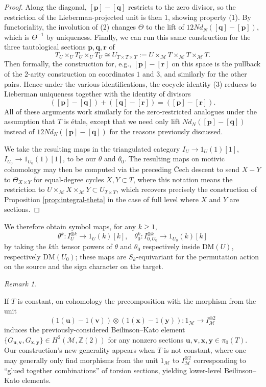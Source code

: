 \documentclass[a4paper,reqno,11pt]{amsart}
\theoremstyle{plain}
\theoremstyle{definition}
\theoremstyle{remark}
\newtheorem{remarkwr}[theorem]{Remark}
\newenvironment{remark}{\begin{remarkwr}\begin{upshape}}{\end{upshape}\end{remarkwr}}
\newcommand{\Z}{\mathbb{Z}}
\newcommand{\DM}{\mathrm{DM}}
\begin{document}
\begin{proof}
Along the diagonal, $[\mathbf p]-[\mathbf q]$ restricts to the zero divisor, so the restriction of the Lieberman-projected unit is then $1$, showing property (1). By functoriality, the involution of (2) changes $\Theta$ to the lift of $12Nd_N([\mathbf q]-[\mathbf p])$, which is $\Theta^{-1}$ by uniqueness. Finally, we can run this same construction for the three tautological sections $\mathbf p,\mathbf q,\mathbf r$ of 
\[
    T_U \times_U T_U \times_U T_U \cong U_{T\times T\times T}:= U\times_{\mathcal{M}} T \times_{\mathcal{M}} T \times_{\mathcal{M}}T.
\]
Then formally, the construction for, e.g., $[\mathbf p]-[\mathbf r]$ on this space is the pullback of the $2$-arity construction on coordinates $1$ and $3$, and similarly for the other pairs. Hence under the various identifications, the cocycle identity (3) reduces to Lieberman uniqueness together with the identity of divisors
\[
([\mathbf p]-[\mathbf q]) + ([\mathbf q]-[\mathbf r])= ([\mathbf p]-[\mathbf r]).
\]
All of these arguments work similarly for the zero-restricted analogues under the assumption that $T$ is \'{e}tale, except that we need only lift $Nd_N([\mathbf p]-[\mathbf q])$ instead of $12Nd_N([\mathbf p]-[\mathbf q])$ for the reasons previously discussed. 

We take the resulting maps in the triangulated category $I_U\to 1_U(1)[1]$, $I_{U_0}\to 1_{U_0}(1)[1]$, to be our $\theta$ and $\theta_0$. The resulting maps on motivic cohomology may then be computed via the preceding \v{C}ech descent to send $X-Y$ to $\Theta_{X\times Y}$ for equal-degree cycles $X,Y\subset T$, where this notation means the restriction to $U\times_{\mathcal{M}} X \times_{\mathcal{M}} Y \subset U_{T\times T}$, which recovers precisely the construction of Proposition \ref{prop:integral-theta} in the case of full level where $X$ and $Y$ are sections.
\end{proof}

We therefore obtain symbol maps, for any $k\ge 1$,
\[
\theta^{k}: I_U^{\otimes k} \to 1_U(k)[k], \;\;\;\theta_0^{k}: I_{0,U_0}^{\otimes k} \to 1_{U_0}(k)[k]
\]
by taking the $k$th tensor powers of $\theta$ and $\theta_0$ respectively inside $\DM(U)$, respectively $\DM(U_0)$; these maps are $S_k$-equivariant for the permutation action on the source and the sign character on the target.

\begin{remark}
If $T$ is constant, on cohomology the precomposition with the morphism from the unit 
\[
(1(\mathbf{u})-1(\mathbf{v})) \otimes (1(\mathbf{x})-1(\mathbf{y})) :1_{\mathcal{M}} \to I_{\mathcal{M}}^{\otimes 2}
\]
induces the previously-considered Beilinson--Kato element $\{G_{\mathbf{u},\mathbf{v}}, G_{\mathbf{x},\mathbf{y}}\}\in H^2(\mathcal{M},\Z(2))$ for any nonzero sections $\mathbf{u,v,x,y}\in \pi_0(T)$. Our construction's new generality appears when $T$ is not constant, where one may generally only find morphisms from the unit $1_{\mathcal{M}}$ to $I_{\mathcal{M}}^{\otimes 2}$ corresponding to ``glued together combinations'' of torsion sections, yielding lower-level Beilinson--Kato elements.
\end{remark}
\end{document}
